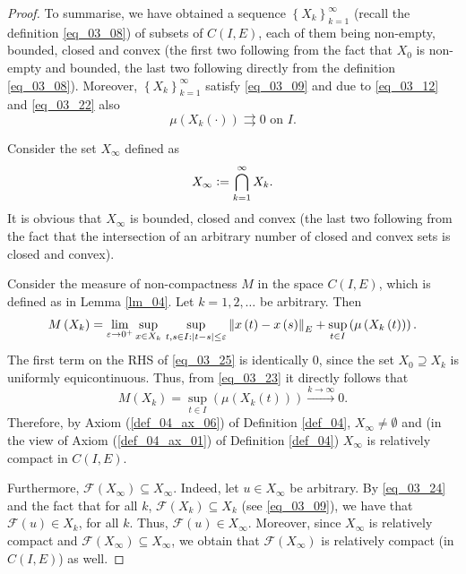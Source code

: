 \documentclass[reqno]{amsart}
\numberwithin{equation}{section}
\theoremstyle{definition}
\theoremstyle{remark}
\newcommand{\axiomRef}[1]{\textrm{Axiom (\ref{#1})}}
\newcommand{\br}[1]{\left(#1\right)}
\newcommand{\C}[2]{C\br{#1,#2}}
\newcommand{\cbr}[1]{\left\{#1\right\}}
\newcommand{\definitionRef}[1]{\textrm{Definition \ref{#1}}}
\newcommand{\defeq}{\vcentcolon=}
\newcommand{\eps}{\varepsilon}
\newcommand{\fF}{\mathcal{F}}
\newcommand{\lemmaRef}[1]{\textrm{Lemma \ref{#1}}}
\newcommand{\st}{\!:}
\begin{document}
\begin{proof}
	To summarise, we have obtained a sequence $\cbr{X_k}_{k=1}^\infty$ (recall the definition \eqref{eq_03_08}) of subsets of $\C{I}{E}$, each of them being non-empty, bounded, closed and convex (the first two following from the fact that $X_0$ is non-empty and bounded, the last two following directly from the definition \eqref{eq_03_08}). Moreover, $\cbr{X_k}_{k=1}^{\infty}$ satisfy \eqref{eq_03_09} and due to \eqref{eq_03_12} and \eqref{eq_03_22} also
	\begin{equation}\label{eq_03_23}
		\mu\br{X_k\br{\cdot}}\rightrightarrows0\text{ on }I.
	\end{equation}
	
	Consider the set $X_{\infty}$ defined as
	\begin{equation}\label{eq_03_24}
		X_{\infty}\defeq\bigcap_{k=1}^{\infty}X_k.
	\end{equation}
	It is obvious that $X_{\infty}$ is bounded, closed and convex (the last two following from the fact that the intersection of an arbitrary number of closed and convex sets is closed and convex).
	
	Consider the measure of non-compactness $M$ in the space $\C{I}{E}$, which is defined as in \lemmaRef{lm_04}. Let $k=1,2,\dots$ be arbitrary. Then
	\begin{equation}\label{eq_03_25}
		M\br{X_k}=\lim_{\eps\rightarrow0^+}\sup_{x\in{X}_k}\,\sup_{t,s\in{I}\,\st\abs{t-s}\leq\eps}\norm{x\br{t}-x\br{s}}_E+\sup_{t\in{I}}\br{\mu\br{X_k\br{t}}}.
	\end{equation}
	The first term on the RHS of \eqref{eq_03_25} is identically $0$, since the set $X_0\supseteq{X}_k$ is uniformly equicontinuous. Thus, from \eqref{eq_03_23} it directly follows that
	\begin{equation*}
		M\br{X_k}=\sup_{t\in{I}}\br{\mu\br{X_k\br{t}}}\xrightarrow{k\rightarrow{\infty}}0.
	\end{equation*}
	Therefore, by \axiomRef{def_04_ax_06} of \definitionRef{def_04}, $X_{\infty}\neq\emptyset$ and (in the view of \axiomRef{def_04_ax_01} of \definitionRef{def_04}) $X_{\infty}$ is relatively compact in $\C{I}{E}$.
	
	Furthermore, $\fF\br{X_{\infty}}\subseteq{X}_{\infty}$. Indeed, let $u\in{X}_{\infty}$ be arbitrary. By \eqref{eq_03_24} and the fact that for all $k$, $\fF\br{X_k}\subseteq{X}_k$ (see \eqref{eq_03_09}), we have that $\fF\br{u}\in{X}_k$, for all $k$. Thus, $\fF\br{u}\in{X}_{\infty}$. Moreover, since $X_{\infty}$ is relatively compact and $\fF\br{X_{\infty}}\subseteq{X}_{\infty}$, we obtain that $\fF\br{X_{\infty}}$ is relatively compact (in $\C{I}{E}$) as well.
	

\end{proof}
\end{document}
